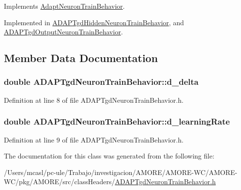 Implements \hyperlink{class_adapt_neuron_train_behavior_aee5cc56b9437dc549975d99f3fc084fd}{AdaptNeuronTrainBehavior}.



Implemented in \hyperlink{class_a_d_a_p_tgd_hidden_neuron_train_behavior_adb273e3b254899151634329da2999c06}{ADAPTgdHiddenNeuronTrainBehavior}, and \hyperlink{class_a_d_a_p_tgd_output_neuron_train_behavior_ac729c67a60f0040fb98f4b174d81ee32}{ADAPTgdOutputNeuronTrainBehavior}.



\subsection{Member Data Documentation}
\hypertarget{class_a_d_a_p_tgd_neuron_train_behavior_a19c5795f7e290231a24ec12e72544167}{
\subsubsection[{d\_\-delta}]{\setlength{\rightskip}{0pt plus 5cm}double {\bf ADAPTgdNeuronTrainBehavior::d\_\-delta}}}
\label{class_a_d_a_p_tgd_neuron_train_behavior_a19c5795f7e290231a24ec12e72544167}


Definition at line 8 of file ADAPTgdNeuronTrainBehavior.h.

\hypertarget{class_a_d_a_p_tgd_neuron_train_behavior_a6b1b79bde42df989cab2a92785801103}{
\subsubsection[{d\_\-learningRate}]{\setlength{\rightskip}{0pt plus 5cm}double {\bf ADAPTgdNeuronTrainBehavior::d\_\-learningRate}}}
\label{class_a_d_a_p_tgd_neuron_train_behavior_a6b1b79bde42df989cab2a92785801103}


Definition at line 9 of file ADAPTgdNeuronTrainBehavior.h.



The documentation for this class was generated from the following file:\begin{DoxyCompactItemize}
\item 
/Users/mcasl/pc-\/ule/Trabajo/investigacion/AMORE/AMORE-\/WC/AMORE-\/WC/pkg/AMORE/src/classHeaders/\hyperlink{_a_d_a_p_tgd_neuron_train_behavior_8h}{ADAPTgdNeuronTrainBehavior.h}\end{DoxyCompactItemize}
